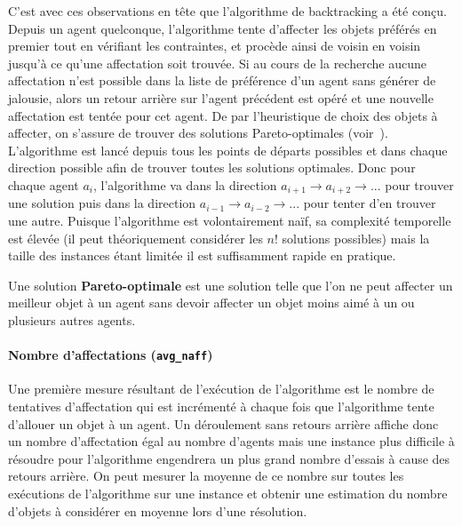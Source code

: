 \documentclass[../main.tex]{subfiles}
\begin{document}
	C'est avec ces observations en tête que l'algorithme de backtracking a été conçu. Depuis un agent quelconque, l'algorithme tente d'affecter les objets préférés en premier tout en vérifiant les contraintes, et procède ainsi de voisin en voisin jusqu'à ce qu'une affectation soit trouvée. Si au cours de la recherche aucune affectation n'est possible dans la liste de préférence d'un agent sans générer de jalousie, alors un retour arrière sur l'agent précédent est opéré et une nouvelle affectation est tentée pour cet agent. De par l'heuristique de choix des objets à affecter, on s'assure de trouver des solutions Pareto-optimales (voir~). L'algorithme est lancé depuis tous les points de départs possibles et dans chaque direction possible afin de trouver toutes les solutions optimales. Donc pour chaque agent $a_i$, l'algorithme va dans la direction $a_{i+1} \rightarrow a_{i+2} \rightarrow ...$ pour trouver une solution puis dans la direction $a_{i-1} \rightarrow a_{i-2} \rightarrow ...$ pour tenter d'en trouver une autre. Puisque l'algorithme est volontairement naïf, sa complexité temporelle est élevée (il peut théoriquement considérer les $n!$ solutions possibles) mais la taille des instances étant limitée il est suffisamment rapide en pratique.
	
	\begin{definition}
	\label{pareto-def}
	    Une solution \textbf{Pareto-optimale} est une solution telle que l'on ne peut affecter un meilleur objet à un agent sans devoir affecter un objet moins aimé à un ou plusieurs autres agents. 
	\end{definition}
	
	\paragraph{Nombre d'affectations (\texttt{avg\_naff})}{Une première mesure résultant de l'exécution de l'algorithme est le nombre de tentatives d'affectation qui est incrémenté à chaque fois que l'algorithme tente d'allouer un objet à un agent. Un déroulement sans retours arrière affiche donc un nombre d'affectation égal au nombre d'agents mais une instance plus difficile à résoudre pour l'algorithme engendrera un plus grand nombre d'essais à cause des retours arrière. On peut mesurer la moyenne de ce nombre sur toutes les exécutions de l'algorithme sur une instance et obtenir une estimation du nombre d'objets à considérer en moyenne lors d'une résolution.}
	
\end{document}
